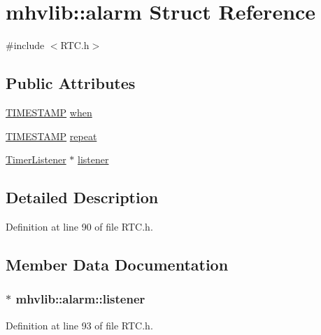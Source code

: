 \hypertarget{structmhvlib_1_1alarm}{\section{mhvlib\-:\-:alarm Struct Reference}
\label{structmhvlib_1_1alarm}
}


{\ttfamily \#include $<$R\-T\-C.\-h$>$}

\subsection*{Public Attributes}
\begin{DoxyCompactItemize}
\item 
\hyperlink{namespacemhvlib_ae0658d1591e8aabca3a4b259a0c483cd}{T\-I\-M\-E\-S\-T\-A\-M\-P} \hyperlink{structmhvlib_1_1alarm_a0bb8fc4ccaa59eb1135cf899c270b358}{when}
\item 
\hyperlink{namespacemhvlib_ae0658d1591e8aabca3a4b259a0c483cd}{T\-I\-M\-E\-S\-T\-A\-M\-P} \hyperlink{structmhvlib_1_1alarm_af6b4badb6e8465e58cc9776f89e80482}{repeat}
\item 
\hyperlink{classmhvlib_1_1_timer_listener}{Timer\-Listener} $\ast$ \hyperlink{structmhvlib_1_1alarm_afd9eb9fc05c06cea4e441b44cb15df94}{listener}
\end{DoxyCompactItemize}


\subsection{Detailed Description}


Definition at line 90 of file R\-T\-C.\-h.



\subsection{Member Data Documentation}
\hypertarget{structmhvlib_1_1alarm_afd9eb9fc05c06cea4e441b44cb15df94}{
\subsubsection[{listener}]{$\ast$ mhvlib\-::alarm\-::listener}}\label{structmhvlib_1_1alarm_afd9eb9fc05c06cea4e441b44cb15df94}


Definition at line 93 of file R\-T\-C.\-h.

